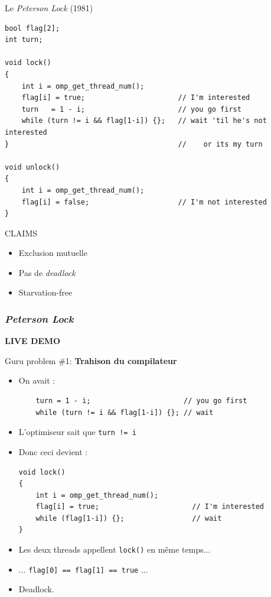 \documentclass[xcolor={x11names,svgnames},x11names,svgnames]{beamer}
\begin{document}
\begin{frame}[fragile, label=peterson_code]
  \begin{block}{Le \emph{Peterson Lock} (1981)}
\begin{verbatim}
bool flag[2];
int turn;

void lock()
{
    int i = omp_get_thread_num();
    flag[i] = true;                      // I'm interested
    turn   = 1 - i;                      // you go first
    while (turn != i && flag[1-i]) {};   // wait 'til he's not interested
}                                        //    or its my turn

void unlock() 
{
    int i = omp_get_thread_num();
    flag[i] = false;                     // I'm not interested
}
\end{verbatim}
\end{block}

\begin{alertblock}{CLAIMS}
  \begin{itemize}
  \item Exclusion mutuelle
  \item Pas de \emph{deadlock}
  \item Starvation-free
  \end{itemize}
\end{alertblock}
\end{frame}


\begin{frame}[label=peterson_demo]
  \frametitle{\emph{Peterson Lock}}

  \centering \Huge \bfseries LIVE DEMO
\end{frame}


\begin{frame}[label=peterson_report1, fragile]

  \begin{block}{Guru problem \#1: \bfseries Trahison du compilateur}
    \begin{itemize}
      \item On avait :
    \begin{verbatim}
    turn = 1 - i;                      // you go first
    while (turn != i && flag[1-i]) {}; // wait
\end{verbatim}

\item L'optimiseur \og sait\fg{} que \texttt{turn != i}
\item Donc ceci devient :
  \begin{verbatim}
void lock()
{
    int i = omp_get_thread_num();
    flag[i] = true;                      // I'm interested
    while (flag[1-i]) {};                // wait
}
\end{verbatim}
\item Les deux threads appellent \texttt{lock()} en même temps...
\item ... \texttt{flag[0] == flag[1] == true} ...
\item Deadlock.
\end{itemize}
\end{block}
\end{frame}
\end{document}
